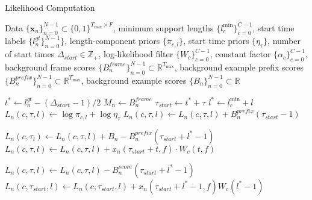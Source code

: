 \documentclass{article}
\begin{document}
\begin{algorithm}
\caption{Likelihood Computation}
\label{alg-likelihood_computation}
\begin{algorithmic}[1]
  \REQUIRE Data $\{\mathbf{x}_n\}_{n=0}^{N-1}\subset \{0,1\}^{T_{\max}\times F}$,
           minimum support lengths $\{ l_c^{\min}\}_{c=0}^{C-1}$,
           start time labels $\{ l_n^{gt}\}_{n=0}^{N-1}\}$,
           length-component priors $\{ \pi_{c,l}\}$,
           start time priors $\{ \eta_{\tau}\}$,
           number of start times $\Delta_{start}\in\mathbb{Z}_+$,
           log-likelihood filter $\{ W_c\}_{c=0}^{C-1}$,
           constant factor $\{ \alpha_c\}_{c=0}^{C-1}$,
           background frame scores $\{ B^{frame}_n \}_{n=0}^{N-1} \subset \mathbb{R}^{T_{\max}}$,
           background example prefix scores $\{B^{prefix}_n\}_{n=0}^{N-1}\subset\mathbb{R}^{T_{\max}}$,
           background example scores $\{B_n\}_{n=0}^{N-1}\subset\mathbb{R}$

       \STATE $t^*\gets l_n^{gt} - (\Delta_{start} -1 )/2$
       \STATE $M_n\gets B^{frame}_n$
               \STATE $\tau_{start}\gets t^*+\tau$
                   \STATE $l^* \gets l_c^{\min}+l$
                       \STATE $L_n(c,\tau,l)\gets \log \pi_{c,l}+\log \eta_{\tau}$
                           \STATE $L_n(c,\tau,l) \gets L_n(c,\tau,l)+ B^{prefix}_n(\tau_{start}-1)$
                       \ENDIF

                       \STATE $L_n(c,\tau_l)\gets L_n(c,\tau,l) + B_n - B^{prefix}_n(\tau_{start}+l^*-1)$ 
                                \STATE $L_n(c,\tau,l)\gets L_n(c,\tau,l) + x_n(\tau_{start}+t,f)\cdot W_c(t,f)$
                           \ENDFOR

                       \ENDFOR
                       
                   \ELSE
                       \STATE $L_n(c,\tau,l)\gets L_n(c,\tau,l) - B_n^{score}(\tau_{start}+l^*-1)$
                           \STATE $L_n(c,\tau_{start},l) \gets L_n(c,\tau_{start},l) + x_n(\tau_{start}+l^*-1,f)W_c(l^*-1) $
                       \ENDFOR
                       


\end{algorithmic}
\end{algorithm}
\end{document}
